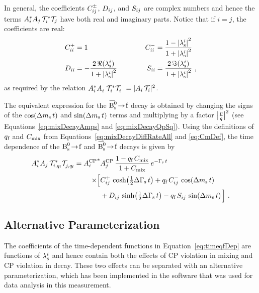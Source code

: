 In general, the coefficients $\Cf[ij]^\pm$, $\Df[ij]$, and $\Sf[ij]$ are complex numbers and hence the terms
$\Ai^*\Ai[j]\,\timeAmp^*\timeAmp[j]$ have both real and imaginary parts. Notice that if $i=j$, the coefficients are real:
\begin{equation}
  \begin{alignedat}{2}
    \Cf[ii]^+ &= 1                                                    &  \Cf[ii]^- &= \frac{1-\lamsiSq}{1+\lamsiSq} \\
    \Df[ii]   &= -\frac{2\,\Re(\lamsi)}{1+\lamsiSq} \qquad\qquad  &  \Sf[ii]   &= \frac{2\,\Im(\lamsi)}{1+\lamsiSq} \ ,
  \end{alignedat}
\end{equation}
as required by the relation $\Ai^*\Ai^{\phantom{*}}\,\timeAmp^*\timeAmp^{\phantom{*}} = |\Ai\,\timeAmp|^2$.

The equivalent expression for the $\Bsbartof$ decay is obtained by changing the signs of the $\cDms$ and $\sDms$ terms and multiplying
by a factor $\pqAbsAlt^\text{2}$ (see Equations~\ref{eq:mixDecayAmps} and \ref{eq:mixDecayQpSq}). Using the definitions of $\qf$ and
$\Cm$ from Equations~\ref{eq:mixDecayDiffRateAll} and \ref{eq:CmDef}, the time dependence of the $\Bstof$ and $\Bsbartof$ decays is
given by
\begin{equation}
  \label{eq:timeqfDep}
  \begin{aligned}
    \Ai^*\Ai[j]\,\timeAmp[i,\qf]^*\timeAmp[j,\qf]^{\phantom{*}} =
      \AAvConj&\AAv[{\Ai[j]}]\, \frac{1-\qf\,\Cm}{1+\Cm}\, \eGst \\
          \times\Big[ &\Cf[ij]^+\,\cDGs + \qf\,\Cf[ij]^-\,\cDms \\
                      &+ \Df[ij]\,\sDGs - \qf\,\Sf[ij]\,\sDms \Big] \ .
  \end{aligned}
\end{equation}


\subsection{Alternative Parameterization}
\label{subsec:pheno_time_altParam}
The coefficients of the time-dependent functions in Equation~\ref{eq:timeqfDep} are functions of $\lamsi$ and hence contain both the
effects of CP violation in mixing and CP violation in decay. These two effects can be separated with an alternative parameterization, which
has been implemented in the software that was used for data analysis in this measurement.

